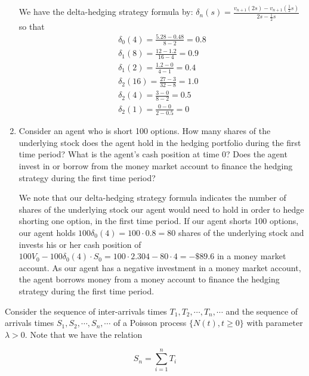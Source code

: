 \documentclass[12pt,twoside, letter]{exam}
\theoremstyle{definition}
\begin{document}
\begin{enumerate}
\begin{solution}
      We have the delta-hedging strategy formula by:
      $\delta_n(s) = \frac{v_{n+1}(2s)-v_{n+1}(\frac{1}{2}s)}{2s - \frac{1}{2}s}$ so that
      \begin{align*}
        \delta_0(4) = \frac{5.28 - 0.48}{8-2} = 0.8 \\
        \delta_1(8) = \frac{12 - 1.2}{16-4} = 0.9 \\
        \delta_1(2) = \frac{1.2 - 0}{4 - 1} = 0.4 \\
        \delta_2(16) = \frac{27 - 3}{32 - 8} = 1.0 \\
        \delta_2(4) = \frac{3 - 0}{8 - 2} = 0.5 \\
        \delta_2(1) = \frac{0 - 0}{2 - 0.5} = 0
      \end{align*}
    \end{solution}
  \item Consider an agent who is short 100 options. How many shares of the underlying stock does the agent hold in the hedging portfolio during
  the first time period? What is the agent's cash position at time 0? Does the agent invest in or borrow from the money
  market account to finance the hedging strategy during the first time period?
    \begin{solution}
      We note that our delta-hedging strategy formula indicates the number of shares of the underlying stock our agent would need to hold in order to hedge shorting one option,
      in the first time period. If our agent shorts 100 options, our agent holds $100\delta_0(4) = 100 \cdot 0.8 = 80$ shares of the underlying stock and invests
      his or her cash position of $100V_0 - 100\delta_0(4)\cdot S_0 = 100\cdot 2.304 - 80 \cdot 4 = -\$89.6$ in a money market account. As our agent has a negative investment
      in a money market account, the agent borrows money from a money account to finance the hedging strategy during the first time period.
    \end{solution}
\end{enumerate}


\par{Consider the sequence of inter-arrivals times $T_1, T_2, \cdots, T_n, \cdots$ and the sequence of arrivals times $S_1, S_2, \cdots, S_n, \cdots$ of a
Poisson process $\{N(t), t \geq 0 \}$ with parameter $\lambda > 0$. Note that we have the relation}

\begin{equation*}
  S_n = \sum^{n}_{i=1} T_i
\end{equation*}
\end{document}
